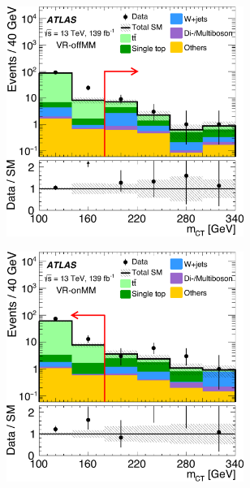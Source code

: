 \begin{figure}
\begin{subfigure}[b]{0.5\linewidth}
	\end{subfigure}\hfill
	\par\medskip
	\begin{subfigure}[b]{0.5\linewidth}
		\centering\includegraphics[width=0.85\textwidth]{fig_03d_yellow}
	\end{subfigure}\hfill
	\begin{subfigure}[b]{0.5\linewidth}
		\centering\includegraphics[width=0.85\textwidth]{fig_03c_yellow}
	\end{subfigure}\hfill
	\par\medskip

\end{figure}
